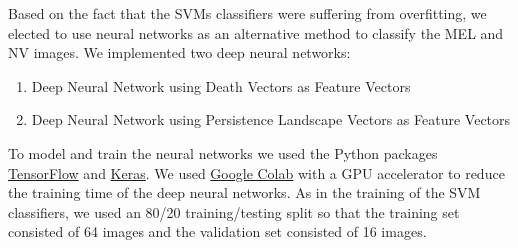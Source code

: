 \documentclass[11pt, reqno]{amsart}
\theoremstyle{plain}
\theoremstyle{definition}
\begin{document}
Based on the fact that the SVMs classifiers were suffering from overfitting, we elected to use neural networks as an alternative method to classify the MEL and NV images. We implemented two deep neural networks:
\begin{enumerate}
    \item Deep Neural Network using Death Vectors as Feature Vectors
    \item Deep Neural Network using Persistence Landscape Vectors as Feature Vectors
\end{enumerate} 
To model and train the neural networks we used the Python packages \href{https://www.tensorflow.org/}{TensorFlow} and \href{https://keras.io/}{Keras}. We used \href{https://colab.research.google.com/notebooks/welcome.ipynb#recent=true}{Google Colab} with a GPU accelerator to reduce the training time of the deep neural networks. As in the training of the SVM classifiers, we used an 80/20 training/testing split so that the training set consisted of 64 images and the validation set consisted of 16 images. 
\end{document}
